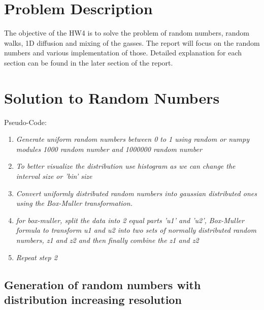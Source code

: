 \documentclass[11pt]{article}
\begin{document}
\section{Problem Description}
The objective of the HW4 is to solve the problem of random numbers, random walks, 1D diffusion and mixing of the gasses. The report will focus on the random numbers and various implementation of those. Detailed explanation for each section can be found in the later section of the report.

\section{Solution to Random Numbers}
Pseudo-Code:
\begin{enumerate}
    \item \textit{Generate uniform random numbers between 0 to 1 using random or numpy modules 1000 random number and 1000000 random number}
    \item \textit{To better visualize the distribution use histogram as we can change the interval size or 'bin' size}
    \item \textit{Convert uniformly distributed random numbers into gaussian distributed ones using the Box-Muller transformation.}
    \item \textit{for box-muller, split the data into 2 equal parts 'u1' and 'u2',  Box-Muller formula to transform u1 and u2 into two sets of normally distributed random numbers, z1 and z2 and then finally combine the z1 and z2}
    \item \textit{Repeat step 2}
    
\end{enumerate}
\subsection{Generation of random numbers with distribution increasing resolution}
\end{document}

